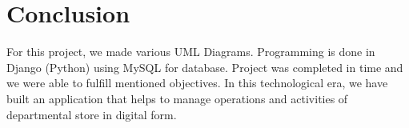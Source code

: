 \section{Conclusion}

For this project, we made various UML Diagrams. Programming is done in Django
(Python) using MySQL for database. Project was completed in time and we were
able to fulfill mentioned objectives. In this technological era, we have built
an application that helps to manage operations and activities of departmental
store in digital form.
